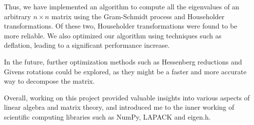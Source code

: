 \documentclass{article}
\begin{document}
Thus, we have implemented an algorithm to compute all the eigenvalues of
an arbitrary $n \times n$ matrix using the Gram-Schmidt process and
Householder transformations. Of these two, Householder transformations were found
to be more reliable. We also optimized our algorithm using techniques such as
deflation, leading to a significant performance increase.

In the future, further optimization methods such as Hessenberg reductions and
Givens rotations could be explored, as they might be a faster and more accurate way to
decompose the matrix.

Overall, working on this project provided valuable insights into various
aspects of linear algebra and matrix theory, and introduced me to the
inner working of scientific computing libraries such as NumPy, LAPACK
and eigen.h.

\nocite{*}
\printbibliography
\end{document}
